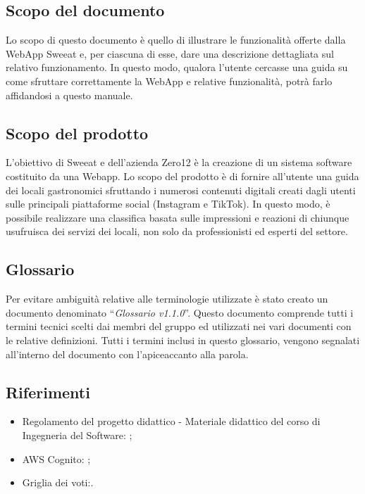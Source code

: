 
\subsection{Scopo del documento}

Lo scopo di questo documento è quello di illustrare le funzionalità offerte dalla WebApp Sweeat e, per ciascuna di esse, dare una descrizione dettagliata sul relativo funzionamento.
In questo modo, qualora l’utente cercasse una guida su come sfruttare correttamente la WebApp e relative funzionalità, potrà farlo affidandosi a questo manuale. 

\subsection{Scopo del prodotto}

L’obiettivo di Sweeat e dell’azienda Zero12 è la creazione di un sistema software costituito da una Webapp. Lo scopo del prodotto è di fornire all’utente una guida dei locali gastronomici sfruttando i numerosi contenuti digitali creati dagli utenti sulle principali piattaforme social (Instagram e TikTok). In questo modo, è possibile realizzare una classifica basata sulle impressioni e reazioni di chiunque usufruisca dei servizi dei locali, non solo da professionisti ed esperti del settore.

\subsection{Glossario}

Per evitare ambiguità relative alle terminologie utilizzate è stato creato un documento denominato “\textit{Glossario v1.1.0}”. Questo documento comprende tutti i termini tecnici scelti dai membri del gruppo ed utilizzati nei vari documenti con le relative definizioni. Tutti i termini inclusi in questo glossario, vengono segnalati all’interno del documento con l’apice\glo accanto alla parola. 

\subsection{Riferimenti}
\begin{itemize}
    \item Regolamento del progetto didattico - Materiale didattico del corso di Ingegneria del Software: \newline{};
    \item AWS Cognito: \newline {};
    \item Griglia dei voti:\newline {}.
\end{itemize}